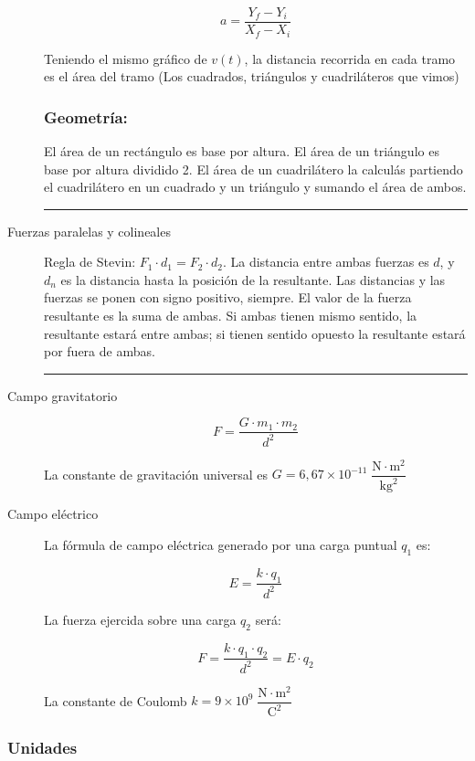 \begin{description}
    \[a=\dfrac{Y_f - Y_i}{X_f - X_i}\]
    
    Teniendo el mismo gráfico de $v(t)$, la distancia recorrida en cada tramo es el área del tramo (Los cuadrados, triángulos y cuadriláteros que vimos)
    
    \subsubsection*{Geometría:}
    
    El área de un rectángulo es base por altura. El área de un triángulo es base por altura dividido 2. El área de un cuadrilátero la calculás partiendo el cuadrilátero en un cuadrado y un triángulo y sumando el área de ambos.
    \vspace{0.5cm}

    \hrule

    \item[Fuerzas paralelas y colineales]\hfil

    Regla de Stevin: $F_1 \cdot d_1 = F_2 \cdot d_2$. La distancia entre ambas fuerzas es $d$, y $d_n$ es la distancia hasta la posición de la resultante. Las distancias y las fuerzas se ponen con signo positivo, siempre. El valor de la fuerza resultante es la suma de ambas. Si ambas tienen mismo sentido, la resultante estará entre ambas; si tienen sentido opuesto la resultante estará por fuera de ambas.

\skipline
\hrule
\skipline

\item[Campo gravitatorio]\hfil
$$F = \dfrac{G\cdot m_1 \cdot m_2}{d^2}$$

La constante de gravitación universal es $G = 6,67\times 10^{-11}\;\dfrac{\text{N}\cdot \text{m}^2}{\text{kg}^2}$

\item[Campo eléctrico]\hfil

La fórmula de campo eléctrica generado por una carga puntual $q_1$ es:

$$E = \dfrac{k \cdot q_1}{d^2}$$

La fuerza ejercida sobre una carga $q_2$ será:

$$F = \dfrac{k\cdot q_1 \cdot q_2}{d^2} = E \cdot q_2$$ 

La constante de Coulomb $k = 9\times 10^{9}\;\dfrac{\text{N}\cdot \text{m}^2}{\text{C}^2}$

\end{description}

\subsubsection*{Unidades}

